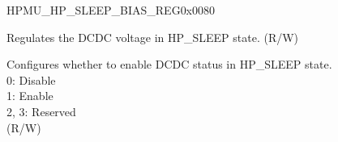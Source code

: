 \begin{register}{H}{PMU\_HP\_SLEEP\_BIAS\_REG}{0x0080}\label{regdesc:PMUHPSLEEPBIASREG}
%
%
%
%
\regnewline%
\begin{regdesc}\begin{reglist}
\label{fielddesc:PMUHPSLEEPDCMVSET}\item [PMU\_HP\_SLEEP\_DCM\_VSET] Regulates the DCDC voltage in HP\_SLEEP state. (R/W)
\label{fielddesc:PMUHPSLEEPDCMMODE}\item [PMU\_HP\_SLEEP\_DCM\_MODE] Configures whether to enable DCDC status in HP\_SLEEP state.\\
0: Disable \\
1: Enable \\
2, 3: Reserved\\
(R/W)
\end{reglist}\end{regdesc}
\end{register}


